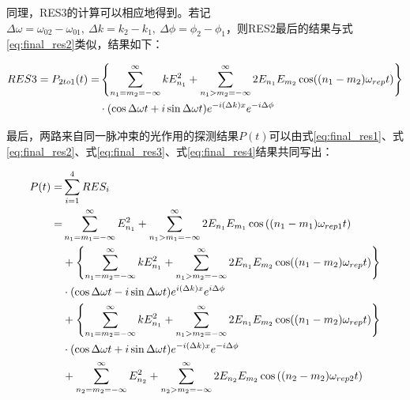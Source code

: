 同理，RES3的计算可以相应地得到。若记$\Delta\omega=\omega_{02}-\omega_{01},\ \Delta k=k_2-k_1,\ \Delta\phi=\phi_2-\phi_1$，则RES2最后的结果与式\eqref{eq:final_res2}类似，结果如下：
\begin{small}
\begin{align}
    RES3=P_{2to1}(t)=&\left\{\sum_{n_1=m_2=-\infty}^{\infty}kE_{n_1}^2+\sum_{n_1>m_2=-\infty}^{\infty}2E_{n_1}E_{m_2}\cos((n_1-m_2)\omega_{rep}t)\right\}\notag\\
    & \cdot (\cos\Delta\omega t+i\sin\Delta\omega t)e^{-i(\Delta k)x}e^{-i\Delta\phi}\label{eq:final_res3}
\end{align}    
\end{small}

最后，两路来自同一脉冲束的光作用的探测结果$P(t)$可以由式\eqref{eq:final_res1}、式\eqref{eq:final_res2}、式\eqref{eq:final_res3}、式\eqref{eq:final_res4}结果共同写出：
\begin{small}
\begin{align}
    P(t)=&\sum_{i=1}^{4}RES_i\\
    =&\sum_{n_1=m_1=-\infty}^{\infty}E_{n_1}^2 + \sum_{n_1>m_1=-\infty}^{\infty}2E_{n_1} E_{m_1} \cos\left((n_1-m_1)\omega_{rep1}t\right)\\
    &+\left\{\sum_{n_1=m_2=-\infty}^{\infty}kE_{n_1}^2+\sum_{n_1>m_2=-\infty}^{\infty}2E_{n_1}E_{m_2}\cos((n_1-m_2)\omega_{rep}t)\right\}\notag\\
    & \cdot (\cos\Delta\omega t-i\sin\Delta\omega t)e^{i(\Delta k)x}e^{i\Delta\phi}\\
    &+\left\{\sum_{n_1=m_2=-\infty}^{\infty}kE_{n_1}^2+\sum_{n_1>m_2=-\infty}^{\infty}2E_{n_1}E_{m_2}\cos((n_1-m_2)\omega_{rep}t)\right\}\notag\\
    & \cdot (\cos\Delta\omega t+i\sin\Delta\omega t)e^{-i(\Delta k)x}e^{-i\Delta\phi}\\
    &+\sum_{n_2=m_2=-\infty}^{\infty}E_{n_2}^2 + \sum_{n_2>m_2=-\infty}^{\infty}2E_{n_2} E_{m_2} \cos\left((n_2-m_2)\omega_{rep2}t\right)
\end{align}
\end{small}

